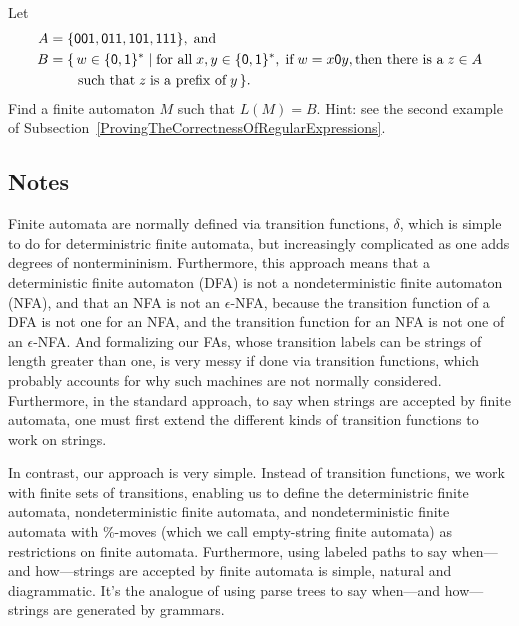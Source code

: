 \begin{exercise}
Let
\begin{align*}
A &=\{\mathsf{001, 011, 101, 111}\} , \;\allowbreak\mbox{and}\allowbreak\; \\
B &=\{\,w\in\{\mathsf{0,1}\}^* \mid \allowbreak\mbox{for all}\allowbreak\;x,y\in\{\mathsf{0,1}\}^*,
\;\allowbreak\mbox{if}\allowbreak\;w=x\mathsf{0} y, \allowbreak\mbox{then there is a}\allowbreak\; z\in A \\
&\quad\;\;\; \;\allowbreak\mbox{such that}\allowbreak\; z\;\allowbreak\mbox{is a prefix of}\allowbreak\; y\,\}.
\end{align*}
Find a finite automaton $M$ such that $L(M)=B$.  Hint: see the second
example of Subsection~\ref{ProvingTheCorrectnessOfRegularExpressions}.
\end{exercise}

\subsection{Notes}

Finite automata are normally defined via transition functions,
$\delta$, which is simple to do for deterministric finite automata,
but increasingly complicated as one adds degrees of nontermininism.
Furthermore, this approach means that a deterministic finite automaton
(DFA) is not a nondeterministic finite automaton (NFA), and that an
NFA is not an $\epsilon$-NFA, because the transition function of a DFA
is not one for an NFA, and the transition function for an NFA is not
one of an $\epsilon$-NFA.  And formalizing our FAs, whose transition
labels can be strings of length greater than one, is very messy if
done via transition functions, which probably accounts for why such
machines are not normally considered.  Furthermore, in the standard
approach, to say when strings are accepted by finite automata, one must
first extend the different kinds of transition functions to work on
strings.

In contrast, our approach is very simple.  Instead of transition
functions, we work with finite sets of transitions, enabling us to
define the deterministric finite automata, nondeterministic finite
automata, and nondeterministic finite automata with $\%$-moves (which
we call empty-string finite automata) as restrictions on finite
automata.  Furthermore, using labeled paths to say when---and
how---strings are accepted by finite automata is simple, natural and
diagrammatic.  It's the analogue of using parse trees to say
when---and how---strings are generated by grammars.

